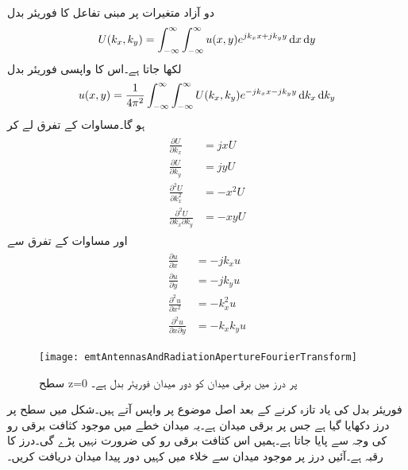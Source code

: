 دو آزاد متغیرات پر مبنی تفاعل  کا فوریئر بدل
\begin{align}\label{مساوات_اینٹینا_فوریئر_بدل_پ}
U(k_x,k_y)=\int_{-\infty}^{\infty} \int_{-\infty}^{\infty} u(x,y)e^{j k_x x+ j k_y y} \dif x \dif y
\end{align}
لکھا جاتا ہے۔اس کا واپسی فوریئر بدل
\begin{align}\label{مساوات_اینٹینا_فوریئر_بدل_ت}
u(x,y)=\frac{1}{4\pi^2}\int_{-\infty}^{\infty} \int_{-\infty}^{\infty} U(k_x,k_y)e^{-j k_x x- j k_y y} \dif k_x \dif k_y
\end{align}
ہو گا۔مساوات  کے تفرق لے کر 
\begin{gather}
\begin{aligned}\label{مساوات_اینٹینا_فوریئر_بدل_ٹ}
\frac{\partial U}{\partial k_x}&=j x U\\
\frac{\partial U}{\partial k_y}&=j y U\\
\frac{\partial^2 U}{\partial k_x^2}&= -x^2 U\\
\frac{\partial^2 U}{\partial k_x \partial k_y}&=-x y U
\end{aligned}
\end{gather}
اور مساوات  کے تفرق سے
\begin{gather}
\begin{aligned}\label{مساوات_اینٹینا_فوریئر_بدل_ث}
\frac{\partial u}{\partial x}&=-j k_x u\\
\frac{\partial u}{\partial y}&=-j k_y u\\
\frac{\partial^2 u}{\partial x^2}&= -k_x^2 u\\
\frac{\partial^2 u}{\partial x \partial y}&=-k_x k_y u
\end{aligned}
\end{gather}

\begin{figure}
\centering
\texttt{[image: emtAntennasAndRadiationApertureFourierTransform]}
\caption{سطح z=0 پر درز میں برقی میدان  کو دور میدان فوریئر بدل ہے۔}
\label{شکل_اینٹینا_درز_فوریئر_بدل}
\end{figure}
فوریئر بدل کی یاد تازہ کرنے کے بعد اصل موضوع پر واپس آتے ہیں۔شکل  میں  سطح پر درز دکھایا گیا ہے جس پر برقی میدان
  ہے۔یہ میدان  خطے میں موجود کثافت برقی رو کی وجہ سے پایا جاتا ہے۔ہمیں اس کثافت برقی رو کی ضرورت نہیں پڑے گی۔درز کا رقبہ  ہے۔آئیں درز پر موجود میدان سے  خلاء میں کہیں دور پیدا میدان دریافت کریں۔ 

